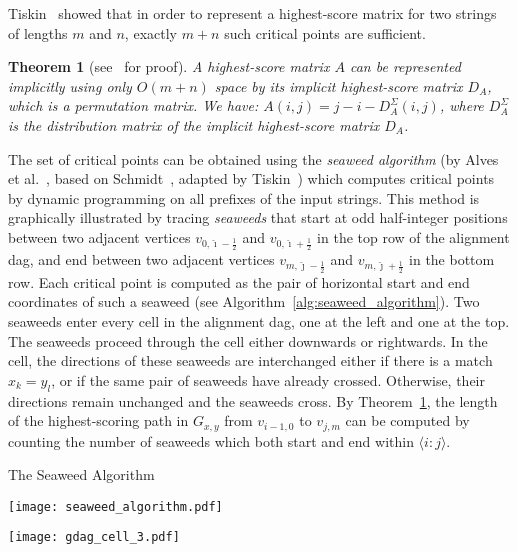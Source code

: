 \documentclass{IOS-Book-Article}     \usepackage{amsmath}
\theoremstyle{plain}
\newtheorem{theorem}{Theorem}[section]
\theoremstyle{definition}
\begin{document}
Tiskin~\cite{Tiskin:05} showed that in order to represent a highest-score matrix
for two strings of lengths $m$ and $n$, exactly $m+n$ such critical points are sufficient.
\begin{theorem}[see~\cite{Tiskin:05} for proof]\label{thm:implicitrep}
A highest-score matrix $A$ can be represented implicitly using only 
$O(m+n)$ space by its implicit highest-score matrix $D_A$, which 
is a permutation matrix. We have: $A(i,j) = j - i -
D^\Sigma_A(i,j)$, where $D_A^\Sigma$ is the distribution matrix of the
implicit highest-score matrix $D_A$. 
\end{theorem}
The set of critical points can be obtained using the \textit{seaweed algorithm}
(by Alves et al.~\cite{Alves+:08}, based on Schmidt~\cite{Schmidt:98}, adapted by
Tiskin~\cite{Tiskin:05}) which computes critical points by dynamic programming
on all prefixes of the input strings.
This method is graphically illustrated by tracing \emph{seaweeds} that
start at odd half-integer positions between two adjacent vertices $v_{0, \hat{\imath} - \frac{1}{2}}$ and
$v_{0,\hat{\imath} + \frac{1}{2}}$ in the top row of the alignment dag,
and end between two adjacent vertices $v_{m, \hat{\jmath} - \frac{1}{2}}$ and
$v_{m,\hat{\jmath} + \frac{1}{2}}$ in the bottom row. Each critical point is
computed as the pair of horizontal start and end coordinates of such a seaweed
(see Algorithm~\ref{alg:seaweed_algorithm}). Two seaweeds enter every cell in
the alignment dag, one at  the left and one at the top. The seaweeds
proceed through the cell  either downwards or rightwards. In the cell, the
directions of these seaweeds are interchanged either if there is a match
$x_{k} = y_{l}$, or if the same  pair of seaweeds have already crossed.
Otherwise, their directions remain unchanged and the seaweeds cross. 
By Theorem~\ref{thm:implicitrep}, the length of the 
highest-scoring path in $G_{x,y}$ from $v_{i-1,0}$ to $v_{j,m}$
can be computed by counting the number of seaweeds which both start and end
within $\langle i:j\rangle$. 

\begin{algorithm}[b]
\caption{\label{alg:seaweed_algorithm}The Seaweed Algorithm}
\begin{minipage}[c]{0.5\textwidth}

\vspace{.1cm}
\texttt{[image: seaweed\_algorithm.pdf]}

\vspace{.1cm}
\end{minipage}
\begin{minipage}[c]{0.49\textwidth}

\vspace{.1cm}
\begin{center}
\texttt{[image: gdag\_cell\_3.pdf]}
\end{center}

\vspace{.1cm}
\end{minipage}
\end{algorithm}
\end{document}
